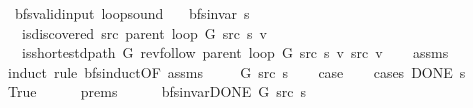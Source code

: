\begin{isabellebody}
\isamarkupfalse%
%
\endisatagproof
{\isafoldproof}%
%
\isadelimproof
\isanewline
%
\endisadelimproof
\isanewline
{}\isamarkupfalse%
\ {\isacharparenleft}{\kern0pt}\ bfs{\isacharunderscore}{\kern0pt}valid{\isacharunderscore}{\kern0pt}input{\isacharparenright}{\kern0pt}\ loop{\isacharunderscore}{\kern0pt}sound{\isacharcolon}{\kern0pt}\isanewline
\ \ \ {\isachardoublequoteopen}bfs{\isacharunderscore}{\kern0pt}invar{\isacharprime}{\kern0pt}{\isacharprime}{\kern0pt}\ s{\isachardoublequoteclose}\isanewline
\ \ \ {\isachardoublequoteopen}is{\isacharunderscore}{\kern0pt}discovered\ src\ {\isacharparenleft}{\kern0pt}parent\ {\isacharparenleft}{\kern0pt}loop\ G\ src\ s{\isacharparenright}{\kern0pt}{\isacharparenright}{\kern0pt}\ v{\isachardoublequoteclose}\isanewline
\ \ \ {\isachardoublequoteopen}is{\isacharunderscore}{\kern0pt}shortest{\isacharunderscore}{\kern0pt}dpath\ G\ {\isacharparenleft}{\kern0pt}rev{\isacharunderscore}{\kern0pt}follow\ {\isacharparenleft}{\kern0pt}parent\ {\isacharparenleft}{\kern0pt}loop\ G\ src\ s{\isacharparenright}{\kern0pt}{\isacharparenright}{\kern0pt}\ v{\isacharparenright}{\kern0pt}\ src\ v{\isachardoublequoteclose}\isanewline
%
\isadelimproof
\ \ %
\endisadelimproof
%
\isatagproof
{}\isamarkupfalse%
\ assms\isanewline
{}\isamarkupfalse%
\ {\isacharparenleft}{\kern0pt}induct\ rule{\isacharcolon}{\kern0pt}\ bfs{\isacharunderscore}{\kern0pt}induct{\isacharbrackleft}{\kern0pt}OF\ assms{\isacharparenleft}{\kern0pt}{}{\isacharparenright}{\kern0pt}{\isacharbrackright}{\kern0pt}{\isacharparenright}{\kern0pt}\isanewline
\ \ \isamarkupfalse%
\ {\isacharparenleft}{\kern0pt}{}\ G\ src\ s{\isacharparenright}{\kern0pt}\isanewline
\ \ \isamarkupfalse%
\ {\isacharquery}{\kern0pt}case\isanewline
\ \ \isamarkupfalse%
\ {\isacharparenleft}{\kern0pt}cases\ {\isachardoublequoteopen}DONE\ s{\isachardoublequoteclose}{\isacharparenright}{\kern0pt}\isanewline
\ \ \ \ \isamarkupfalse%
\ True\isanewline
\ \ \ \ \isamarkupfalse%
\ {\isachardoublequoteopen}{}{\isachardot}{\kern0pt}prems{\isachardoublequoteclose}{\isacharparenleft}{\kern0pt}{}{\isacharparenright}{\kern0pt}\isanewline
\ \ \ \ \isamarkupfalse%
\ {\isachardoublequoteopen}bfs{\isacharunderscore}{\kern0pt}invar{\isacharunderscore}{\kern0pt}DONE{\isacharprime}{\kern0pt}\ G\ src\ s{\isachardoublequoteclose}\isanewline

\end{isabellebody}

